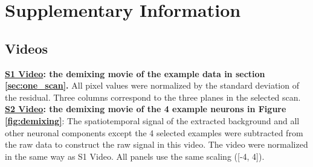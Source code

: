 \documentclass[10pt,letterpaper]{article}
\def \videoOneURL{https://www.dropbox.com/s/0ph27nsx5fxcc1b/demixing_scan_1_201_9100.avi?dl=0}
\def \videoTwoURL{https://www.dropbox.com/s/jmkedq2f3nniy0a/demixing_example.avi?dl=0}
\begin{document}
{%

\clearpage

\section{Supplementary Information}

\subsection{Videos}

\noindent \href{\videoOneURL}{\bf S1 Video}{\bf: the demixing movie of the example data in section \ref{sec:one_scan}.} All pixel values were normalized by the standard deviation of the residual. Three columns correspond to the three planes in the selected scan.   \\

\noindent\href{\videoTwoURL}{\bf S2 Video}{\bf: the demixing movie of the 4 example neurons in Figure \ref{fig:demixing}}: The spatiotemporal signal of the extracted background and all other neuronal components except the 4 selected examples were subtracted from the raw data to construct the raw signal in this video. The video were normalized in the same way as S1 Video.  All panels use the same scaling ([-4, 4]). 


}
\end{document}
